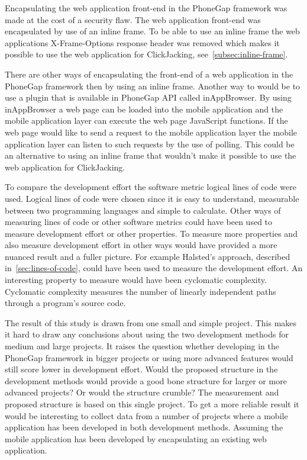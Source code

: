 Encapsulating the web application front-end in the PhoneGap framework was made at the cost of a security flaw. The web application front-end was encapsulated by use of an inline frame. To be able to use an inline frame the web applications X-Frame-Options response header was removed which makes it possible to use the web application for ClickJacking, see~\ref{subsec:inline-frame}. 

There are other ways of encapsulating the front-end of a web application in the PhoneGap framework then by using an inline frame. Another way to would be to use a plugin that is available in PhoneGap API called inAppBrowser. By using inAppBrowser a web page can be loaded into the mobile application and the mobile application layer can execute the web page JavaScript functions. If the web page would like to send a request to the mobile application layer the mobile application layer can listen to such requests by the use of polling.  This could be an alternative to using an inline frame that wouldn’t make it possible to use the web application for ClickJacking. 

To compare the development effort the software metric logical lines of code were used. Logical lines of code were chosen since it is easy to understand, measurable between two programming languages and simple to calculate. Other ways of measuring lines of code or other software metrics could have been used to measure development effort or other properties. To measure more properties and also measure development effort in other ways would have provided a more nuanced result and a fuller picture. For example Halsted's approach, described in~\ref{sec:lines-of-code}, could have been used to measure the development effort. An interesting property to measure would have been cyclomatic complexity. Cyclomatic complexity measures the number of linearly independent paths through a program’s source code. 

The result of this study is drawn from one small and simple project. This makes it hard to draw any conclusions about using the two development methods for medium and large projects. It raises the question whether developing in the PhoneGap framework in bigger projects or using more advanced features would still score lower in development effort. Would the proposed structure in the development methods would provide a good bone structure for larger or more advanced projects? Or would the structure crumble? The measurement and proposed structure is based on this single project. To get a more reliable result it would be interesting to collect data from a number of projects where a mobile application has been developed in both development methods. Assuming the mobile application has been developed by encapsulating an existing web application.  

